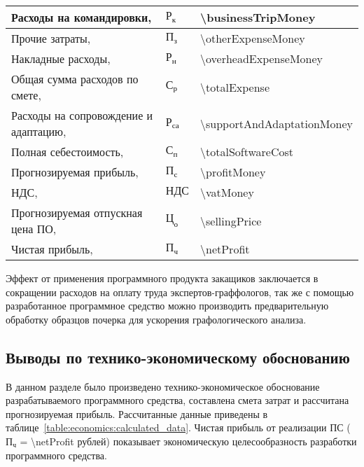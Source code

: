 \begin{longtable}{| >{\raggedright}m{}
                  | >{\centering}m{}
                  | >{\centering\arraybackslash}m{}|}
    Расходы на командировки, \byr{}
    & $ \text{Р}_\text{к} $
    & \num{\businessTripMoney}
    \\ \hline

    Прочие затраты, \byr{}
    & $ \text{П}_\text{з} $
    & \num{\otherExpenseMoney}
    \\ \hline

    Накладные расходы, \byr{}
    & $ \text{Р}_\text{н} $
    & \num{\overheadExpenseMoney}
    \\ \hline

    Общая сумма расходов по смете, \byr{}
    & $ \text{С}_\text{р} $
    & \num{\totalExpense}
    \\ \hline

    Расходы на сопровождение и адаптацию, \byr{}
    & $ \text{Р}_\text{са} $
    & \num{\supportAndAdaptationMoney}
    \\ \hline

    Полная себестоимость, \byr{}
    & $ \text{С}_\text{п} $
    & \num{\totalSoftwareCost}
    \\ \hline

    Прогнозируемая прибыль, \byr{}
    & $ \text{П}_\text{с} $
    & \num{\profitMoney}
    \\ \hline

    НДС, \byr{}
    & $ \text{НДС} $
    & \num{\vatMoney}
    \\ \hline

    Прогнозируемая отпускная цена ПО, \byr{}
    & $ \text{Ц}_\text{о} $
    & \num{\sellingPrice}
    \\ \hline

    Чистая прибыль, \byr{}
    & $ \text{П}_\text{ч} $
    & \num{\netProfit}
    \\ \hline
\end{longtable}

Эффект от применения программного продукта закащиков заключается в сокращении расходов на оплату труда экспертов-граффологов, так же с помощью разработанное программное средство можно производить предварительную обработку образцов почерка для ускорения графологического анализа. 

\subsection{Выводы по технико-экономическому обоснованию}
В данном разделе было произведено технико-экономическое обоснование разрабатываемого программного средства, составлена смета затрат и рассчитана прогнозируемая прибыль. Рассчитанные данные приведены в таблице~\ref{table:economics:calculated_data}.
Чистая прибыль от реализации ПС ($ \text{П}_\text{ч} $ = \num{\netProfit} рублей) показывает экономическую целесообразность разработки программного средства.
\clearpage
